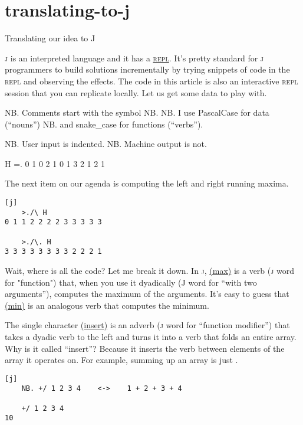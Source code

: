 \documentclass{article}
\begin{document}
\section{translating-to-j}{Translating our idea to J}

\textsc{j} is an interpreted language and it has a \href{https://en.wikipedia.org/wiki/Read%E2%80%93eval%E2%80%93print_loop}{\textsc{repl}}.
It's pretty standard for \textsc{j} programmers to build solutions incrementally by trying snippets of code in the \textsc{repl} and observing the effects.
The code in this article is also an interactive \textsc{repl} session that you can replicate locally.
Let us get some data to play with.

\begin{code}[j]
    NB. Comments start with the symbol NB.
    NB. I use PascalCase for data (“nouns”)
    NB. and snake_case for functions (“verbs”).

    NB. User input is indented.
NB. Machine output is not.

    H =. 0 1 0 2 1 0 1 3 2 1 2 1
\end{code}

The next item on our agenda is computing the left and right running maxima.

\begin{verbatim}[j]
    >./\ H
0 1 1 2 2 2 2 3 3 3 3 3

    >./\. H
3 3 3 3 3 3 3 3 2 2 2 1
\end{verbatim}

Wait, where is all the code?
Let me break it down.
In \textsc{j}, \href{https://code.jsoftware.com/wiki/Vocabulary/gtdot#dyadic}{ (max)} is a verb (\textsc{j} word for "function") that, when you use it dyadically (\textsc{J} word for ``with two arguments''), computes the maximum of the arguments.
It's easy to guess that \href{https://code.jsoftware.com/wiki/Vocabulary/ltdot#dyadic}{ (min)} is an analogous verb that computes the minimum.

The single character \href{https://code.jsoftware.com/wiki/Vocabulary/slash}{\code{/} (insert)} is an adverb (\textsc{j} word for ``function modifier'') that takes a dyadic verb to the left and turns it into a verb that folds an entire array.
Why is it called ``insert''?
Because it inserts the verb between elements of the array it operates on.
For example, summing up an array is just \code{+/}.

\begin{verbatim}[j]
    NB. +/ 1 2 3 4    <->    1 + 2 + 3 + 4

    +/ 1 2 3 4
10
\end{verbatim}
\end{document}
